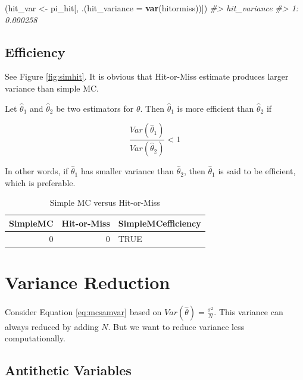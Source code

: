 \documentclass[]{book}
\newenvironment{Shaded}{\begin{snugshade}}{\end{snugshade}}
\newcommand{\CommentTok}[1]{\textcolor[rgb]{0.56,0.35,0.01}{\textit{#1}}}
\newcommand{\DataTypeTok}[1]{\textcolor[rgb]{0.13,0.29,0.53}{#1}}
\newcommand{\KeywordTok}[1]{\textcolor[rgb]{0.13,0.29,0.53}{\textbf{#1}}}
\newcommand{\NormalTok}[1]{#1}
\newcommand{\StringTok}[1]{\textcolor[rgb]{0.31,0.60,0.02}{#1}}
\theoremstyle{definition}
\theoremstyle{definition}
\theoremstyle{definition}
\theoremstyle{remark}
\let\BeginKnitrBlock\begin \let\EndKnitrBlock\end
\begin{document}
\begin{Shaded}
\begin{Highlighting}[]
\NormalTok{(hit_var <-}
\StringTok{  }\NormalTok{pi_hit[,}
\NormalTok{         .(}\DataTypeTok{hit_variance =} \KeywordTok{var}\NormalTok{(hitormiss))])}
\CommentTok{#>    hit_variance}
\CommentTok{#> 1:     0.000258}
\end{Highlighting}
\end{Shaded}

\hypertarget{efficiency-1}{%
\subsection{Efficiency}\label{efficiency-1}}

See Figure \ref{fig:simhit}. It is obvious that Hit-or-Miss estimate produces larger variance than simple MC.

\BeginKnitrBlock{definition}[Efficiency]
\protect\hypertarget{def:eff}{}{\label{def:eff} {} }Let \(\hat\theta_1\) and \(\hat\theta_2\) be two estimators for \(\theta\). Then \(\hat\theta_1\) is more efficient than \(\hat\theta_2\) if

\[\frac{Var(\hat\theta_1)}{Var(\hat\theta_2)} < 1\]
\EndKnitrBlock{definition}

In other words, if \(\hat\theta_1\) has smaller variance than \(\hat\theta_2\), then \(\hat\theta_1\) is said to be efficient, which is preferable.

\begin{longtable}{r|r|l}
\caption{\label{tab:unnamed-chunk-50}Simple MC versus Hit-or-Miss}\\
\hline
SimpleMC & Hit-or-Miss & SimpleMCefficiency\\
\hline
0 & 0 & TRUE\\
\hline
\end{longtable}

\hypertarget{variance-reduction}{%
\section{Variance Reduction}\label{variance-reduction}}

Consider Equation \eqref{eq:mcsamvar} based on \(Var(\hat\theta) = \frac{\sigma^2}{N}\). This variance can always reduced by adding \(N\). But we want to reduce variance less computationally.

\hypertarget{antithetic-variables}{%
\subsection{Antithetic Variables}\label{antithetic-variables}}
\end{document}
